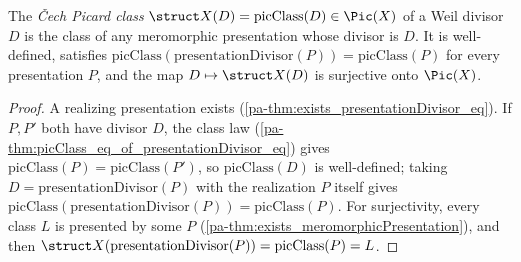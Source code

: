 \begin{definition}
  \label{pa-def:curveDivisor_picClass}
  \leanok

  The \emph{\v Cech Picard class} \(\struct X(D) = \mathrm{picClass}(D) \in \Pic(X)\) of a Weil
  divisor \(D\) is the class of any meromorphic presentation whose divisor is \(D\). It is
  well-defined, satisfies \(\mathrm{picClass}(\mathrm{presentationDivisor}(P)) = \mathrm{picClass}(P)\)
  for every presentation \(P\), and the map \(D \mapsto \struct X(D)\) is surjective onto
  \(\Pic(X)\).
\end{definition}
\begin{proof}
  \leanok
  A realizing presentation exists (\ref{pa-thm:exists_presentationDivisor_eq}). If \(P, P'\) both have
  divisor \(D\), the class law (\ref{pa-thm:picClass_eq_of_presentationDivisor_eq}) gives
  \(\mathrm{picClass}(P) = \mathrm{picClass}(P')\), so \(\mathrm{picClass}(D)\) is well-defined;
  taking \(D = \mathrm{presentationDivisor}(P)\) with the realization \(P\) itself gives
  \(\mathrm{picClass}(\mathrm{presentationDivisor}(P)) = \mathrm{picClass}(P)\). For surjectivity,
  every class \(L\) is presented by some \(P\) (\ref{pa-thm:exists_meromorphicPresentation}), and then
  \(\struct X(\mathrm{presentationDivisor}(P)) = \mathrm{picClass}(P) = L\).
\end{proof}


